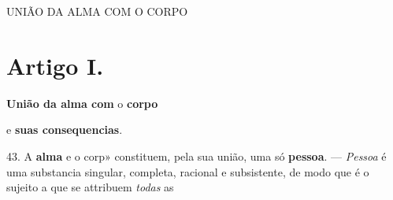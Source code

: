 




UNIÃO DA ALMA COM O CORPO


\section*{Artigo I.}

 \textbf{União da alma com} o \textbf{corpo}

e \textbf{suas consequencias}.

43. A \textbf{alma} e o corp» constituem, pela sua união, uma só \textbf{pessoa}. --- \emph{Pessoa} é uma substancia singular, completa, racional e subsistente, de modo que é o sujeito a que se attribuem \emph{todas} as

